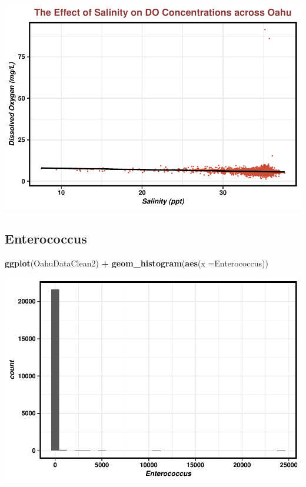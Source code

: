 \documentclass[12pt,]{article}
\newenvironment{Shaded}{\begin{snugshade}}{\end{snugshade}}
\newcommand{\KeywordTok}[1]{\textcolor[rgb]{0.13,0.29,0.53}{\textbf{#1}}}
\newcommand{\DataTypeTok}[1]{\textcolor[rgb]{0.13,0.29,0.53}{#1}}
\newcommand{\StringTok}[1]{\textcolor[rgb]{0.31,0.60,0.02}{#1}}
\newcommand{\OperatorTok}[1]{\textcolor[rgb]{0.81,0.36,0.00}{\textbf{#1}}}
\newcommand{\NormalTok}[1]{#1}
\begin{document}
\includegraphics{Garcia_ENV872_Project_files/figure-latex/unnamed-chunk-49-1.pdf}

\subsection{Enterococcus}\label{enterococcus}

\begin{Shaded}
\begin{Highlighting}[]
\KeywordTok{ggplot}\NormalTok{(OahuDataClean2) }\OperatorTok{+}
\StringTok{  }\KeywordTok{geom_histogram}\NormalTok{(}\KeywordTok{aes}\NormalTok{(}\DataTypeTok{x =}\NormalTok{Enterococcus))}
\end{Highlighting}
\end{Shaded}

\includegraphics{Garcia_ENV872_Project_files/figure-latex/unnamed-chunk-50-1.pdf}
\end{document}

